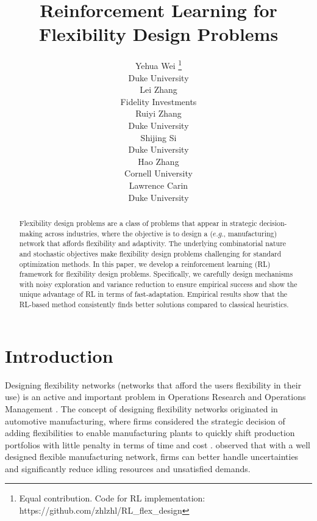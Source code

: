 \documentclass{article} %
\title{Reinforcement Learning for Flexibility Design Problems}
\author{Yehua Wei \thanks{ Equal contribution. Code for RL implementation: https://github.com/zhlzhl/RL\_flex\_design} \\
Duke University \\
\And
Lei Zhang \footnotemark[1] \\
Fidelity Investments\\
\And
Ruiyi Zhang \\
Duke University \\
\And
Shijing Si \\
Duke University \\
\And
Hao Zhang \\
Cornell University \\
\And
Lawrence Carin \\
Duke University \\

}
\begin{document}
\maketitle

\begin{abstract}
Flexibility design problems are a class of problems that appear in strategic decision-making across industries, where the objective is to design a ($e.g.$, manufacturing) network that affords flexibility and adaptivity. The underlying combinatorial nature and stochastic objectives make flexibility design problems challenging for standard optimization methods. In this paper, we develop a reinforcement learning (RL) framework for flexibility design problems. Specifically, we carefully design mechanisms with noisy exploration and variance reduction to ensure empirical success and show the unique advantage of RL in terms of fast-adaptation. Empirical results show that the RL-based method consistently finds better solutions compared to classical heuristics.
\end{abstract}

\section{Introduction}



Designing flexibility networks (networks that afford the users flexibility in their use) is an active and important problem in Operations Research and Operations Management \citep{chou2008process, wang2019review}. The concept of designing flexibility networks originated in automotive manufacturing, where firms considered the strategic decision of adding flexibilities to enable manufacturing plants to quickly shift production portfolios with little penalty in terms of time and cost \citep{JG95}. \citet{JG95} observed that with a well designed flexible manufacturing network, firms can better handle uncertainties and significantly reduce idling resources and unsatisfied demands.
\end{document}
